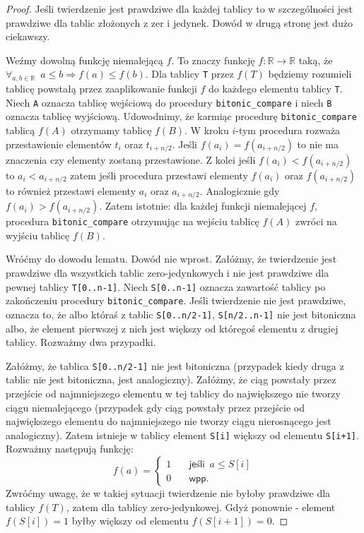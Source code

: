 \begin{proof}
 Jeśli twierdzenie jest prawdziwe dla każdej tablicy to w szczególności jest prawdziwe dla tablic złożonych z zer i jedynek.
 Dowód w drugą stronę jest dużo ciekawszy.
 
 Weźmy dowolną funkcję niemalejącą $f$.
 To znaczy funkcję $f: \mathbb{R} \rightarrow \mathbb{R}$ taką, że $\forall_{a, b \in \mathbb{R}} \enspace a \leq b \Rightarrow f(a) \leq f(b)$.
 Dla tablicy \texttt{T} przez $f(T)$ będziemy rozumieli tablicę powstałą przez zaaplikowanie funkcji $f$ do każdego elementu tablicy \texttt{T}.
 Niech \texttt{A} oznacza tablicę wejściową do procedury \texttt{bitonic\_compare} i niech \texttt{B} oznacza tablicę wyjściową.
 Udowodnimy, że karmiąc procedurę \texttt{bitonic\_compare} tablicą $f(A)$ otrzymamy tablicę $f(B)$.
 W kroku $i$-tym procedura rozważa przestawienie elementów $t_i$ oraz $t_{i+n/2}$.
 Jeśli $f(a_i) = f(a_{i+n/2})$ to nie ma znaczenia czy elementy zostaną przestawione.
 Z kolei jeśli $f(a_i) < f(a_{i+n/2})$ to $a_i < a_{i+n/2}$ zatem jeśli procedura przestawi elementy $f(a_i)$ oraz $f(a_{i+n/2})$ to również przestawi elementy $a_i$ oraz $a_{i+n/2}$.
 Analogicznie gdy $f(a_i) > f(a_{i+n/2})$.
 Zatem istotnie: dla każdej funkcji niemalejącej $f$, procedura \texttt{bitonic\_compare} otrzymując na wejściu tablicę $f(A)$ zwróci na wyjściu tablicę $f(B)$.
 
 Wróćmy do dowodu lematu.
 Dowód nie wprost.
 Załóżmy, że twierdzenie jest prawdziwe dla wszystkich tablic zero-jedynkowych i nie jest prawdziwe dla pewnej tablicy \texttt{T[0..n-1]}.
 Niech \texttt{S[0..n-1]} oznacza zawartość tablicy po zakończeniu procedury \texttt{bitonic\_compare}.
 Jeśli twierdzenie nie jest prawdziwe, oznacza to, że albo któraś z tablic \texttt{S[0..n/2-1]}, \texttt{S[n/2..n-1]} nie jest bitoniczna albo, że element pierwszej z nich jest większy od któregoś elementu z drugiej tablicy.
 Rozważmy dwa przypadki.
 
 Załóżmy, że tablica \texttt{S[0..n/2-1]} nie jest bitoniczna (przypadek kiedy druga z tablic nie jest bitoniczna, jest analogiczny).
 Załóżmy, że ciąg powstały przez przejście od najmniejszego elementu w tej tablicy do największego nie tworzy ciągu niemalejącego (przypadek gdy ciąg powstały przez przejście od największego elementu do najmniejszego nie tworzy ciągu nierosnącego jest analogiczny).
 Zatem istnieje w tablicy element \texttt{S[i]} większy od elementu \texttt{S[i+1]}.
 Rozważmy następują funkcję:
 \[   
  f(a) = 
     \begin{cases}
       1 &\quad\textsf{jeśli} \enspace a \leq S[i]\\
       0 &\quad\textsf{wpp.}
     \end{cases}
 \]
 Zwróćmy uwagę, że w takiej sytuacji twierdzenie nie byłoby prawdziwe dla tablicy $f(T)$, zatem dla tablicy zero-jedynkowej.
 Gdyż ponownie - element $f(S[i]) = 1$ byłby większy od elementu $f(S[i+1]) = 0$.
 

\end{proof}
